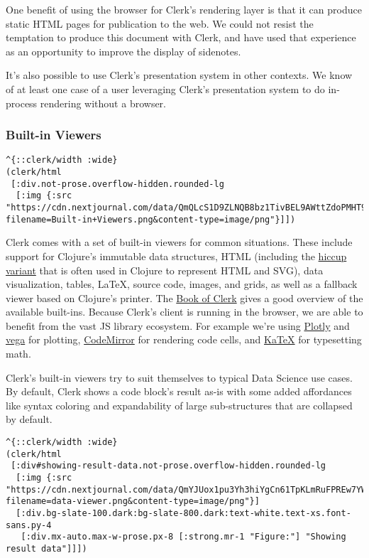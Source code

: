\documentclass[
]{article}
\begin{document}
One benefit of using the browser for Clerk's rendering layer is that it can produce static HTML pages for publication to the web. We could not resist the temptation to produce this document with Clerk, and have used that experience as an opportunity to improve the display of sidenotes.

It's also possible to use Clerk's presentation system in other contexts. We know of at least one case of a user leveraging Clerk's presentation system to do in-process rendering without a browser.

\hypertarget{id}{%
\subsubsection{Built-in Viewers}\label{id}}

\begin{lstlisting}
^{::clerk/width :wide}
(clerk/html
 [:div.not-prose.overflow-hidden.rounded-lg
  [:img {:src "https://cdn.nextjournal.com/data/QmQLcS1D9ZLNQB8bz1TivBEL9AWttZdoPMHT9xDASYYm7F?filename=Built-in+Viewers.png&content-type=image/png"}]])
\end{lstlisting}

Clerk comes with a set of built-in viewers for common situations. These include support for Clojure's immutable data structures, HTML (including the \href{https://github.com/weavejester/hiccup}{hiccup variant} that is often used in Clojure to represent HTML and SVG), data visualization, tables, LaTeX, source code, images, and grids, as well as a fallback viewer based on Clojure's printer. The \href{https://book.clerk.vision}{Book of Clerk} gives a good overview of the available built-ins. Because Clerk's client is running in the browser, we are able to benefit from the vast JS library ecosystem. For example we're using \href{https://plotly.com/javascript/}{Plotly} and \href{https://github.com/vega/vega-embed}{vega} for plotting, \href{https://codemirror.net}{CodeMirror} for rendering code cells, and \href{https://katex.org}{KaTeX} for typesetting math.

Clerk's built-in viewers try to suit themselves to typical Data Science use cases. By default, Clerk shows a code block's result as-is with some added affordances like syntax coloring and expandability of large sub-structures that are collapsed by default.

\begin{lstlisting}
^{::clerk/width :wide}
(clerk/html
 [:div#showing-result-data.not-prose.overflow-hidden.rounded-lg
  [:img {:src "https://cdn.nextjournal.com/data/QmYJUox1pu3Yh3hiYgCn61TpKLmRuFPREw7YWDPtveQ4sc?filename=data-viewer.png&content-type=image/png"}]
  [:div.bg-slate-100.dark:bg-slate-800.dark:text-white.text-xs.font-sans.py-4
   [:div.mx-auto.max-w-prose.px-8 [:strong.mr-1 "Figure:"] "Showing result data"]]])
\end{lstlisting}
\end{document}
